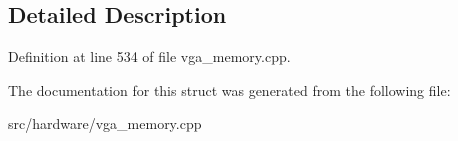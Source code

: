 \subsection{Detailed Description}


Definition at line 534 of file vga\-\_\-memory.\-cpp.



The documentation for this struct was generated from the following file\-:\begin{DoxyCompactItemize}
\item 
src/hardware/vga\-\_\-memory.\-cpp\end{DoxyCompactItemize}
